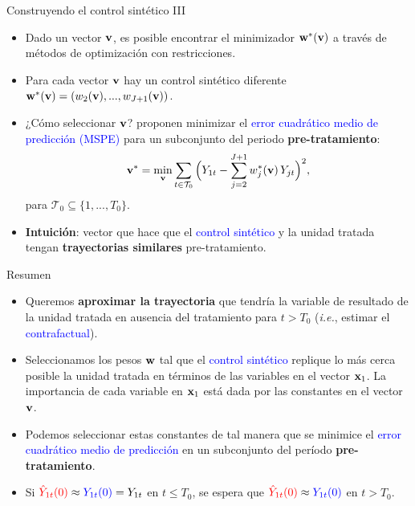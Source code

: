 \documentclass[10pt, xcolor=dvipsnames]{beamer}
\begin{document}
\begin{frame}{Construyendo el control sintético III}
\begin{itemize}\setlength{\itemsep}{1em}
    \item Dado un vector $\textbf{v}$, es posible encontrar el minimizador $\textbf{w}^{*}(\textbf{v})$ a través de métodos de optimización con restricciones. 
    \item Para cada vector $\textbf{v}$ hay un control sintético diferente $\textbf{w}^{*}(\textbf{v}) =\left(w_2(\textbf{v}),...,w_{J+1}(\textbf{v})\right)$. \\ \vspace{0.0cm}
    \item ¿Cómo seleccionar $\textbf{v}$? \citet{abadie2003economic,abadie2010} proponen minimizar el \textcolor{blue}{error cuadrático medio de predicción (MSPE)} para un subconjunto del periodo \textbf{pre-tratamiento}:
    \begin{align*}
        \vB^{*}= \amin_{\vB} \sum_{t\in \mathcal{T}_0} \Big(Y_{1t} - \sum_{j=2}^{J+1} w_j^{*}(\vB)\,Y_{jt}\Big)^2,
    \end{align*}
    \noindent para $\mathcal{T}_0 \subseteq \{1,...,T_0\}$. \\ \vspace{0.0cm}
    \item \textbf{Intuición}: vector que hace que el \textcolor{blue}{control sintético} y la unidad tratada tengan \textbf{trayectorias similares} pre-tratamiento.  
\end{itemize}
\end{frame}


\begin{frame}{Resumen}
\begin{itemize}\setlength{\itemsep}{1em}
    \item Queremos \textbf{aproximar la trayectoria} que tendría la variable de resultado de la unidad tratada en ausencia del tratamiento para $t>T_0$ (\textit{i.e.}, estimar el \textcolor{blue}{contrafactual}).    
    \pause
    \item Seleccionamos los pesos $\textbf{w}$ tal que el \textcolor{blue}{control sintético} replique lo más cerca posible la unidad tratada en términos de las variables en el vector $\textbf{x}_1$. La importancia de cada variable en $\textbf{x}_{1}$ está dada por las constantes en el vector $\textbf{v}$.     
    \pause
    \item Podemos seleccionar estas constantes de tal manera que se minimice el \textcolor{blue}{error cuadrático medio de predicción} en un subconjunto del período \textbf{pre-tratamiento}.    
    \pause
    \item Si $\textcolor{red}{\hat{Y}_{1t}(0)} \approx \textcolor{blue}{Y_{1t}(0)} = Y_{1t}$ en $t\leq T_0$, se espera que $\textcolor{red}{\hat{Y}_{1t}(0)} \approx \textcolor{blue}{Y_{1t}(0)}$ en $t>T_0$.	
\end{itemize}
\end{frame}
\end{document}

